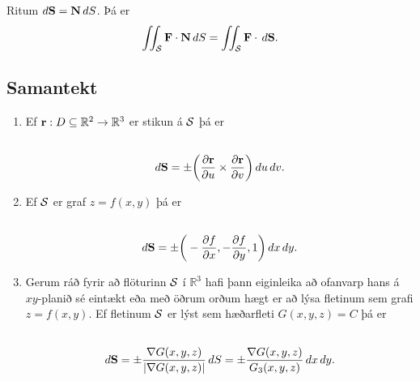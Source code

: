 \documentclass[a4paper,10pt,icelandic]{sphinxmanual}
\begin{document}
Ritum \(d\mbox{${\bf S}$}=\mbox{${\bf N}$}\,dS\). Þá er
\begin{gather}
\begin{split}\displaystyle \int\!\!\!\int_{\cal S} \mbox{${\bf F}$}\cdot\mbox{${\bf N}$}\,dS=\int\!\!\!\int_{\cal S} \mbox{${\bf F}$}\cdot\,d\mbox{${\bf S}$}.\end{split}\notag
\end{gather}

\subsection{Samantekt}
\label{Kafli5:samantekt}\begin{enumerate}
\item {} 
Ef
\(\mbox{${\bf r}$}:D\subseteq{\mathbb  R}^2\rightarrow {\mathbb  R}^3\)
er stikun á \(\cal S\) þá er
\begin{gather}
\begin{split}\displaystyle\end{split}\notag\\\begin{split}d\mbox{${\bf S}$}=\pm \bigg(\frac{\partial \mbox{${\bf r}$}}{\partial u}\times\frac{\partial
  \mbox{${\bf r}$}}{\partial v}\bigg)\,du\,dv.\end{split}\notag
\end{gather}
\item {} 
Ef \(\cal S\) er graf \(z=f(x,y)\) þá er
\begin{gather}
\begin{split}\displaystyle\end{split}\notag\\\begin{split}d\mbox{${\bf S}$}=\pm\bigg(-\frac{\partial f}{\partial x},-\frac{\partial
  f}{\partial y},1\bigg)\,dx\,dy.\end{split}\notag
\end{gather}
\item {} 
Gerum ráð fyrir að flöturinn \(\cal S\) í \({\mathbb  R}^3\)
hafi þann eiginleika að ofanvarp hans á \(xy\)-planið sé eintækt
eða með öðrum orðum hægt er að lýsa fletinum sem grafi
\(z=f(x,y)\). Ef fletinum \(\cal S\) er lýst sem hæðarfleti
\(G(x,y,z)=C\) þá er
\begin{gather}
\begin{split}\displaystyle\end{split}\notag\\\begin{split}d\mbox{${\bf S}$}=\pm\frac{\nabla G(x,y,z)}{|\nabla G(x,y,z)|}\,dS=
\pm\frac{\nabla G(x,y,z)}{G_3(x,y,z)}\,dx\,dy.\end{split}\notag
\end{gather}
\end{enumerate}
\end{document}
